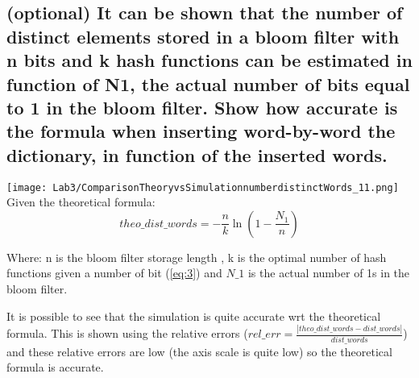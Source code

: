 \documentclass{report}
\begin{document}
{				\subsection{(optional) It can be shown that the number of distinct elements stored in a bloom filter
with n bits and k hash functions can be estimated in function of N1, the actual number of bits equal to 1 in the bloom filter. Show how accurate is the formula when inserting word-by-word the dictionary, in function of the inserted words.}
				\texttt{[image: Lab3/ComparisonTheoryvsSimulationnumberdistinctWords\_11.png]} \\
				Given the theoretical formula: 
				\[ theo\_dist\_words = - \frac{n}{k} \ln \left( 1 - \frac{N_1}{n} \right) \]
				\begin{center}
				Where: n is the bloom filter storage length , k is the optimal number of hash functions given a number of bit  (\ref{eq:3}) and $N\_1$ is the actual number of 1s in the bloom filter. 
				\end{center}
				It is possible to see that the simulation is quite accurate wrt the theoretical formula. This is shown using the relative errors ($ rel\_err=\frac{|theo\_dist\_words-dist\_words|}{dist\_words} $) and these relative errors are low (the axis scale is quite low) so the theoretical formula is accurate.
				
} \fi
\end{document}
